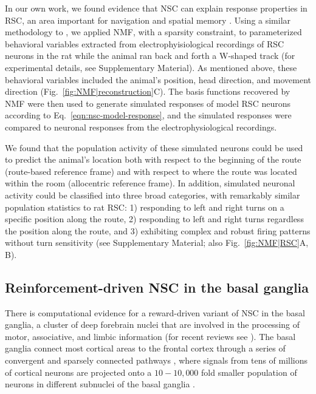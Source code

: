 In our own work, we found evidence that \ac{NSC} 
can explain response properties in \ac{RSC}, 
an area important for navigation and spatial memory 
\cite{Miller2014,Nelson2015,VannAggleton2009}.
Using a similar methodology to \cite{Beyeler2016},
we applied \ac{NMF}, with a sparsity constraint,
to parameterized behavioral variables extracted from electrophyisiological recordings
of \ac{RSC} neurons in the rat \cite{AlexanderNitz2015}
while the animal ran back and forth a W-shaped track
(for experimental details, see Supplementary Material).
As mentioned above, these behavioral variables included the animal's position, head direction, 
and movement direction (Fig.~\ref{fig:NMF|reconstruction}C).
The basis functions recovered by \ac{NMF} were then used to generate simulated responses
of model \ac{RSC} neurons according to Eq.~\ref{eqn:nsc-model-response},
and the simulated responses were compared to neuronal responses 
from the electrophysiological recordings.

We found that the population activity of these simulated neurons could be used to predict
the animal's location both with respect to the beginning of the route
(route-based reference frame)
and with respect to where the route was located within the room
(allocentric reference frame).
In addition, simulated neuronal activity could be classified into three broad categories,
with remarkably similar population statistics to rat \ac{RSC}:
1) responding to left and right turns on a specific position along the route,
2) responding to left and right turns regardless the position along the route,
and 3) exhibiting complex and robust firing patterns without turn sensitivity
(see Supplementary Material; also Fig.~\ref{fig:NMF|RSC}A, B).


\subsection*{Reinforcement-driven NSC in the basal ganglia}

There is computational evidence 
for a reward-driven variant of \ac{NSC} in the basal ganglia, 
a cluster of deep forebrain nuclei that are involved in the 
processing of motor, associative, and limbic information
(for recent reviews see \cite{BarGad2003_Review,NelsonKreitzer2014}).
The basal ganglia connect most cortical areas to the frontal cortex through
a series of convergent and sparsely connected pathways \cite{schwab2015},
where signals from tens of millions of cortical neurons are projected
onto a $10 - 10,000$ fold smaller population of neurons in different subnuclei
of the basal ganglia \cite{BarGad2003_Review}.


